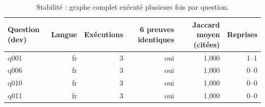 \begin{table}[H]
\centering
\small
\begin{tabular}{lrrrrr}
\toprule
Question (dev) & Langue & Exécutions & 6 preuves identiques & Jaccard moyen (citées) & Reprises \\
\midrule
q001 & fr & 3 & oui & 1{,}000 & 1--1 \\
q006 & fr & 3 & oui & 1{,}000 & 0--0 \\
q010 & fr & 3 & oui & 1{,}000 & 0--0 \\
q011 & fr & 3 & oui & 1{,}000 & 0--0 \\
\bottomrule
\end{tabular}
\caption{Stabilité : graphe complet exécuté plusieurs fois par question.}
\label{tab:noise}
\end{table}
